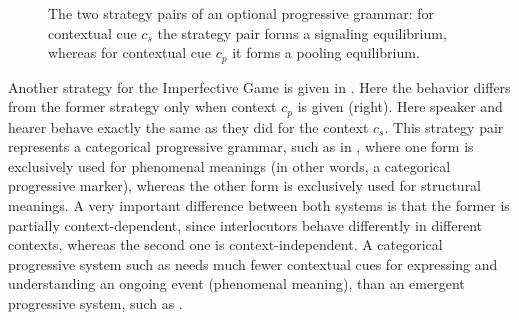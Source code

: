 \documentclass[output=paper,hidelinks]{langscibook}
\begin{document}
\begin{figure}[t]
\centering
\begin{minipage}{51mm}	
\centering  
{}
\end{minipage}
\begin{minipage}{51mm}	
\centering    
{}
\end{minipage}


\caption{The two strategy pairs of an optional progressive grammar: for contextual cue $c_s$ the strategy pair forms a signaling equilibrium, whereas for contextual cue $c_p$ it forms a  pooling equilibrium.}
\label{fig:s2h1-sigsys}
\end{figure}

Another strategy for the Imperfective Game is given in . Here  the behavior differs from the former strategy only when context $c_p$ is given (right). Here speaker and hearer behave exactly the same as they did for the context $c_s$. This strategy pair represents a categorical progressive grammar, such as in , where one form is exclusively used for phenomenal meanings (in other words, a categorical progressive marker), whereas the other form is exclusively used for structural meanings. A very important difference between both systems is that the former is partially context-dependent, since interlocutors behave differently in different contexts, whereas the second one is context-independent. A categorical progressive system such as  needs much fewer contextual cues for expressing and understanding an ongoing event (phenomenal meaning), than an emergent progressive system, such as .
\end{document}
